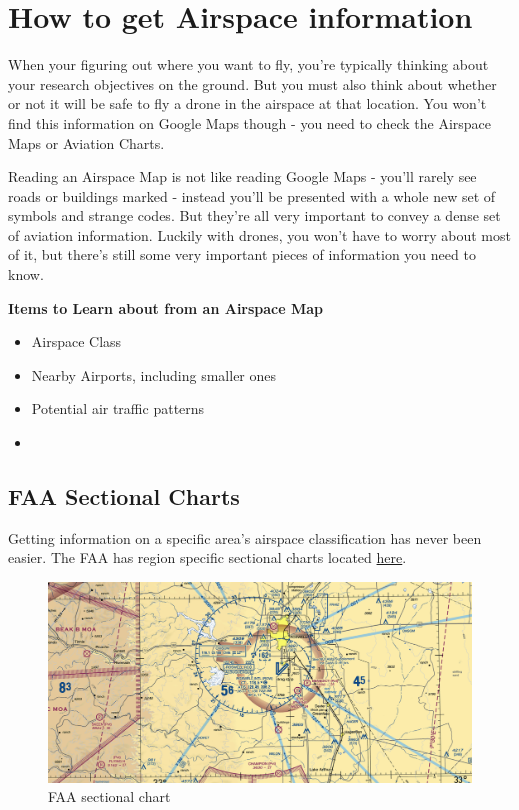 \documentclass[
]{book}
\begin{document}
\hypertarget{ch-airspace-info}{%
\chapter{How to get Airspace information}\label{ch-airspace-info}}

When your figuring out where you want to fly, you're typically thinking about your research objectives on the ground. But you must also think about whether or not it will be safe to fly a drone in the airspace at that location. You won't find this information on Google Maps though - you need to check the Airspace Maps or Aviation Charts.

Reading an Airspace Map is not like reading Google Maps - you'll rarely see roads or buildings marked - instead you'll be presented with a whole new set of symbols and strange codes. But they're all very important to convey a dense set of aviation information. Luckily with drones, you won't have to worry about most of it, but there's still some very important pieces of information you need to know.

\textbf{Items to Learn about from an Airspace Map}

\begin{itemize}
\item
  Airspace Class
\item
  Nearby Airports, including smaller ones
\item
  Potential air traffic patterns
\item
\end{itemize}

\hypertarget{faa-sectional-charts}{%
\section{FAA Sectional Charts}\label{faa-sectional-charts}}

Getting information on a specific area's airspace classification has never been easier. The FAA has region specific sectional charts located \href{https://www.faa.gov/air_traffic/flight_info/aeronav/digital_products/vfr/}{here}.

\begin{figure}
\centering
\includegraphics{images/FAA-VFR.png}
\caption{FAA sectional chart}
\end{figure}
\end{document}
